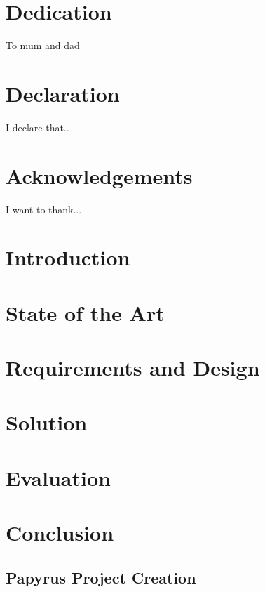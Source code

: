 \documentclass[12pt,twoside]{book}
\begin{document}
\chapter*{Dedication}
To mum and dad

\chapter*{Declaration}
I declare that..

\chapter*{Acknowledgements}
I want to thank...

\tableofcontents
\listoftables
\listoffigures

\chapter{Introduction}


\chapter{State of the Art}


\chapter{Requirements and Design}


\chapter{Solution}


\chapter{Evaluation}


\chapter{Conclusion}


\begin{appendices}
\chapter{Papyrus Project Creation}

\end{appendices}


\end{document}
